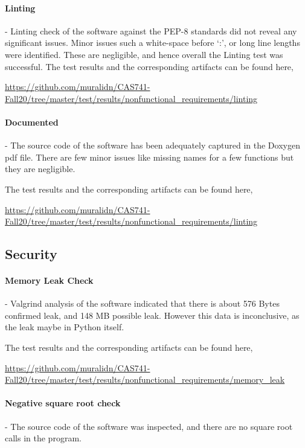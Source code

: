 \documentclass[12pt, titlepage]{article}
\begin{document}
\paragraph{Linting} - Linting check of the  \progname{} software against 
the PEP-8  standards did not reveal any significant issues. Minor issues such 
a white-space before `:', or long line lengths were identified. These are 
negligible, and hence overall the Linting test was successful. The test results 
and the corresponding artifacts can be found here,

 \url{https://github.com/muralidn/CAS741-Fall20/tree/master/test/results/nonfunctional_requirements/linting}

\paragraph{Documented} - The source code of the \progname{} software has been 
adequately captured in the Doxygen pdf file. There are few minor issues like missing
 names for a few functions but they are negligible.

The test results and the corresponding artifacts can be found here,

 \url{https://github.com/muralidn/CAS741-Fall20/tree/master/test/results/nonfunctional_requirements/linting}

\subsection{Security}

\paragraph{Memory Leak Check} - Valgrind analysis of the \progname{} software indicated
that there is about 576 Bytes confirmed leak, and 148 MB possible leak. However this 
data is inconclusive, as the leak maybe in Python itself.

The test results and the corresponding artifacts can be found here,

 \url{https://github.com/muralidn/CAS741-Fall20/tree/master/test/results/nonfunctional_requirements/memory_leak}

\paragraph{Negative square root check} - The source code of the \progname{} software was 
inspected, and there are no square root calls in the program.
\end{document}
